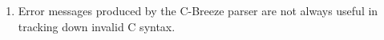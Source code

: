 \documentclass[10pt]{article}
\begin{document}
\begin{enumerate}
\item 
Error messages produced by the C-Breeze parser are not always useful in
tracking down invalid C syntax.


\end{enumerate}
\end{document}
